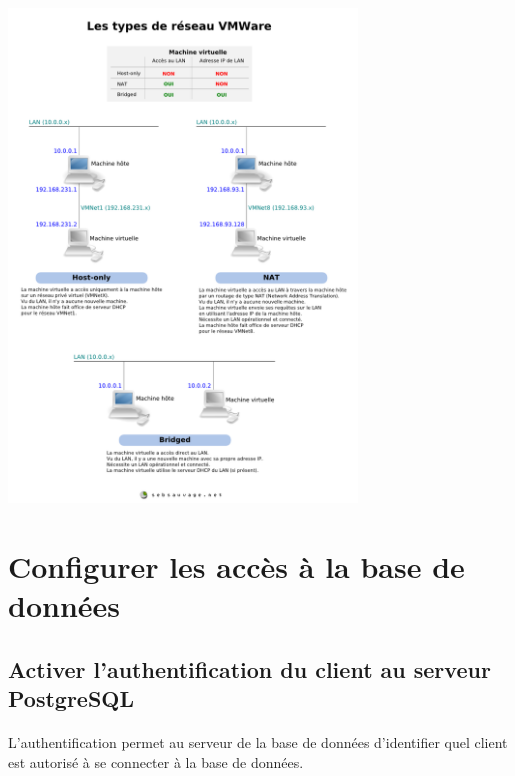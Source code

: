 \documentclass{report}
\begin{document}
		\begin{center}
			\includegraphics[width=350px]{images/reseau-vmware.png}
		\end{center}


	\section*{Configurer les accès à la base de données}


		\subsection*{Activer l’authentification du client au serveur PostgreSQL}

			\paragraph{}{
				L’authentification permet au serveur de la base de données d’identifier quel client est autorisé à se connecter à la base de données.
			}
\end{document}
